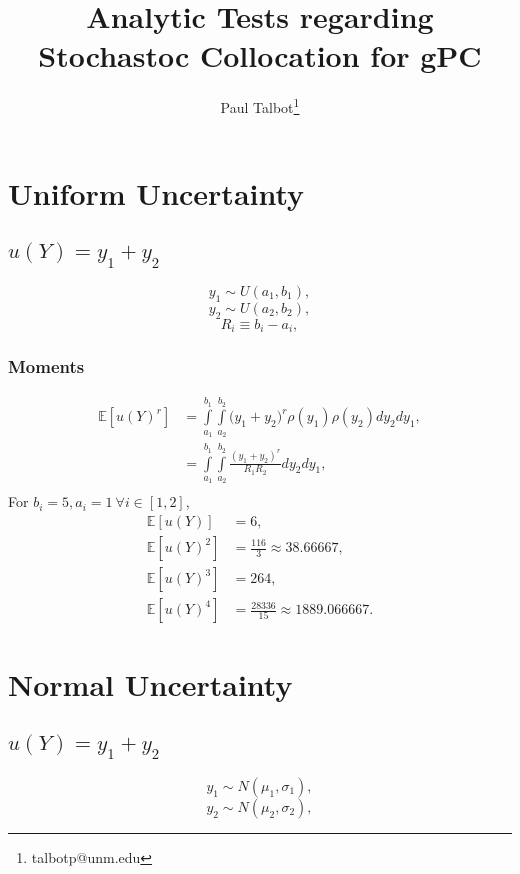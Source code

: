 \documentclass[11pt]{article}
\newcommand{\expv}[1]{\ensuremath{\mathbb{E}[ #1]}}
\newcommand{\intab}[1]{\ensuremath{\int\limits_{a_{#1}}^{b_#1}}}
\begin{document}
\title{Analytic Tests regarding Stochastoc Collocation for gPC}

\author[]{Paul Talbot\thanks{talbotp@unm.edu}}
\renewcommand\Authands{ and }
\maketitle

\section{Uniform Uncertainty}

\subsection{$u(Y)=y_1+y_2$}
\[y_1 \sim U(a_1,b_1),\]
\[y_2 \sim U(a_2,b_2),\]
\[R_i \equiv b_i-a_i,\]
\subsubsection{Moments}
\begin{align}
\expv{u(Y)^r}&=\intab{1}\intab{2}\Big(y_1+y_2\Big)^r\rho(y_1)\rho(y_2) dy_2 dy_1,\\
  &=\intab{1}\intab{2}\frac{(y_1+y_2)^r}{R_1R_2}dy_2 dy_1,\\
\end{align}
For $b_i=5,a_i=1\ \forall i\in[1,2]$,
\begin{align}
  \expv{u(Y)} &= 6,\\
  \expv{u(Y)^2} &= \frac{116}{3}\approx 38.66667,\\
  \expv{u(Y)^3} &= 264,\\
  \expv{u(Y)^4} &= \frac{28336}{15}\approx 1889.066667.
\end{align}



\section{Normal Uncertainty}

\subsection{$u(Y)=y_1+y_2$}
\[y_1 \sim N(\mu_1,\sigma_1),\]
\[y_2 \sim N(\mu_2,\sigma_2),\]
\end{document}
